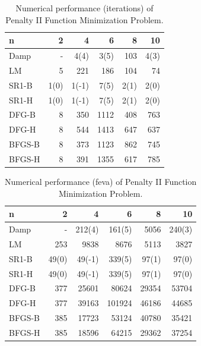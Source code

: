 \documentclass{article}
\begin{document}
\begin{table}[t]
\caption{Numerical performance (iterations) of Penalty II Function Minimization Problem.}
\label{tab3}
\vskip 0.15in
\begin{center}
\begin{small}
\begin{sc}
\begin{tabular}{lrrrrr}
\toprule
n & 2 & 4 & 6 & 8 & 10 \\
\midrule
Damp    & - & 4(4) & 3(5) & 103 & 4(3) \\
LM & 5 & 221 & 186 & 104 & 74 \\
SR1-B   & 1(0) & 1(-1) & 7(5) & 2(1) & 2(0) \\
SR1-H   & 1(0) & 1(-1) & 7(5) & 2(1) & 2(0) \\
DFG-B   & 8 & 350 & 1112 & 408 & 763 \\
DFG-H   & 8 & 544 & 1413 & 647 & 637 \\
BFGS-B  & 8 & 373 & 1123 & 862 & 745 \\
BFGS-H  & 8 & 391 & 1355 & 617 & 785 \\
\bottomrule
\end{tabular}
\end{sc}
\end{small}
\end{center}
\vskip -0.1in
\end{table}

\begin{table}[t]
\caption{Numerical performance (feva) of Penalty II Function Minimization Problem.}
\label{tab4}
\vskip 0.15in
\begin{center}
\begin{small}
\begin{sc}
\begin{tabular}{lrrrrr}
\toprule
n & 2 & 4 & 6 & 8 & 10 \\
\midrule
Damp    & - & 212(4) & 161(5) & 5056 & 240(3) \\
LM & 253 & 9838 & 8676 & 5113 & 3827 \\
SR1-B   & 49(0) & 49(-1) & 339(5) & 97(1) & 97(0) \\
SR1-H   & 49(0) & 49(-1) & 339(5) & 97(1) & 97(0) \\
DFG-B   & 377 & 25601 & 80624 & 29354 & 53704 \\
DFG-H   & 377 & 39163 & 101924 & 46186 & 44685 \\
BFGS-B  & 385 & 17723 & 53124 & 40780 & 35421 \\
BFGS-H  & 385 & 18596 & 64215 & 29362 & 37254 \\
\bottomrule
\end{tabular}
\end{sc}
\end{small}
\end{center}
\vskip -0.1in
\end{table}
\end{document}
